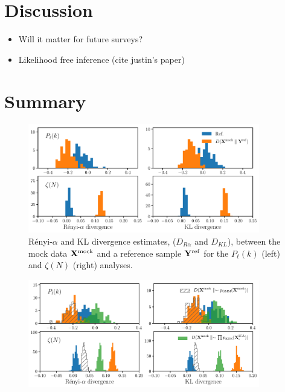 \documentclass[12pt, letterpaper, preprint]{aastex}
\newcommand{\bitem}{\begin{itemize}}
\newcommand{\eitem}{\end{itemize}}
\begin{document}
\section{Discussion}
\bitem
    \item Will it matter for future surveys? 
    \item Likelihood free inference (cite justin's paper) 
\eitem

\section{Summary}

\begin{figure}
\begin{center}
\includegraphics[width=0.9\textwidth]{figs/kNNdiverg_Gauss.pdf}
\caption{R\'enyi-$\alpha$ and KL divergence estimates, ($D_{R\alpha}$ and $D_{KL}$), 
between the mock data ${\bf X}^\mathrm{mock}$ and a reference sample 
${\bf Y}^\mathrm{ref}$ for the $P_\ell(k)$ (left) and $\zeta(N)$ (right) analyses.}
\label{fig:div_nongauss}
\end{center}
\end{figure}

\begin{figure}
\begin{center}
\includegraphics[width=0.9\textwidth]{figs/kNNdiverg_nonGauss.pdf}
\caption{}
\label{fig:div_nongauss}
\end{center}
\end{figure}
\end{document}
